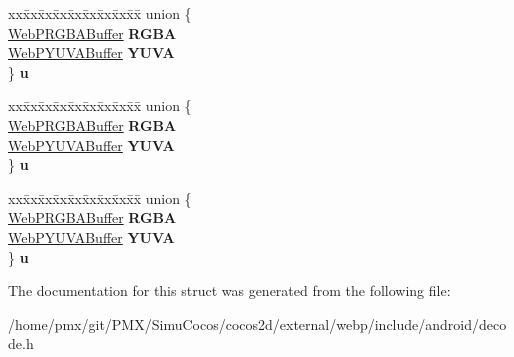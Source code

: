 \begin{DoxyCompactItemize}
\begin{tabbing}
\end{tabbing}\item 
\mbox{\label{structWebPDecBuffer_a7e2a23cbc8f54332fb772c724c32cd97}} 
\begin{tabbing}
xx\=xx\=xx\=xx\=xx\=xx\=xx\=xx\=xx\=\kill
union \{\\
\>\hyperlink{structWebPRGBABuffer}{WebPRGBABuffer} {\bfseries RGBA}\\
\>\hyperlink{structWebPYUVABuffer}{WebPYUVABuffer} {\bfseries YUVA}\\
\} {\bfseries u}\\

\end{tabbing}\item 
\mbox{\label{structWebPDecBuffer_a812b09899d580668c193e066c61d388b}} 
\begin{tabbing}
xx\=xx\=xx\=xx\=xx\=xx\=xx\=xx\=xx\=\kill
union \{\\
\>\hyperlink{structWebPRGBABuffer}{WebPRGBABuffer} {\bfseries RGBA}\\
\>\hyperlink{structWebPYUVABuffer}{WebPYUVABuffer} {\bfseries YUVA}\\
\} {\bfseries u}\\

\end{tabbing}\item 
\mbox{\label{structWebPDecBuffer_aa27a41d709a7b6ac303f0da7d6f8e0d2}} 
\begin{tabbing}
xx\=xx\=xx\=xx\=xx\=xx\=xx\=xx\=xx\=\kill
union \{\\
\>\hyperlink{structWebPRGBABuffer}{WebPRGBABuffer} {\bfseries RGBA}\\
\>\hyperlink{structWebPYUVABuffer}{WebPYUVABuffer} {\bfseries YUVA}\\
\} {\bfseries u}\\

\end{tabbing}\end{DoxyCompactItemize}


The documentation for this struct was generated from the following file\+:\begin{DoxyCompactItemize}
\item 
/home/pmx/git/\+P\+M\+X/\+Simu\+Cocos/cocos2d/external/webp/include/android/decode.\+h\end{DoxyCompactItemize}
